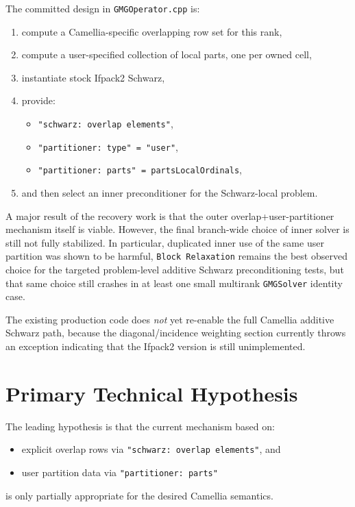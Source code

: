 \documentclass[11pt]{article}
\begin{document}
The committed design in \texttt{GMGOperator.cpp} is:
\begin{enumerate}
  \item compute a Camellia-specific overlapping row set for this rank,
  \item compute a user-specified collection of local parts, one per owned cell,
  \item instantiate stock Ifpack2 Schwarz,
  \item provide:
  \begin{itemize}
    \item \texttt{"schwarz: overlap elements"},
    \item \texttt{"partitioner: type" = "user"},
    \item \texttt{"partitioner: parts" = partsLocalOrdinals},
  \end{itemize}
  \item and then select an inner preconditioner for the Schwarz-local problem.
\end{enumerate}

A major result of the recovery work is that the outer overlap+user-partitioner mechanism itself is viable. However, the final branch-wide choice of inner solver is still not fully stabilized. In particular, duplicated inner use of the same user partition was shown to be harmful, \texttt{Block Relaxation} remains the best observed choice for the targeted problem-level additive Schwarz preconditioning tests, but that same choice still crashes in at least one small multirank \texttt{GMGSolver} identity case.

The existing production code does \emph{not} yet re-enable the full Camellia additive Schwarz path, because the diagonal/incidence weighting section currently throws an exception indicating that the Ifpack2 version is still unimplemented.

\section{Primary Technical Hypothesis}
The leading hypothesis is that the current mechanism based on:
\begin{itemize}
  \item explicit overlap rows via \texttt{"schwarz: overlap elements"}, and
  \item user partition data via \texttt{"partitioner: parts"}
\end{itemize}
is only partially appropriate for the desired Camellia semantics.
\end{document}
